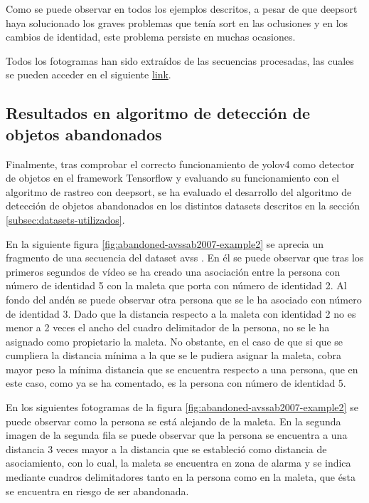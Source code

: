 Como se puede observar en todos los ejemplos descritos, a pesar de que \gls{deepsort} haya solucionado los graves problemas que tenía \gls{sort} en las oclusiones y en los cambios de identidad, este problema persiste en muchas ocasiones.

Todos los fotogramas han sido extraídos de las secuencias procesadas, las cuales se pueden acceder en el siguiente \href{https://drive.google.com/drive/folders/1MIfUcVmwIot6QgV0VRRu5PdFscV1Ma48?usp=sharing}{link}.

\subsection{Resultados en algoritmo de detección de objetos abandonados}
\label{subsec:resultados-abandon-algorithm}

Finalmente, tras comprobar el correcto funcionamiento de \gls{yolov4} como detector de objetos en el framework Tensorflow y evaluando su funcionamiento con el algoritmo de rastreo con \gls{deepsort}, se ha evaluado el desarrollo del algoritmo de detección de objetos abandonados en los distintos datasets descritos en la sección \ref{subsec:datasets-utilizados}.

En la siguiente figura \ref{fig:abandoned-avssab2007-example2} se aprecia un fragmento de una secuencia del dataset \gls{avss} \cite{AVSSAB2007-dataset}. En él se puede observar que tras los primeros segundos de vídeo se ha creado una asociación entre la persona con número de identidad 5 con la maleta que porta con número de identidad 2. Al fondo del andén se puede observar otra persona que se le ha asociado con número de identidad 3. Dado que la distancia respecto a la maleta con identidad 2 no es menor a 2 veces el ancho del cuadro delimitador de la persona, no se le ha asignado como propietario la maleta. No obstante, en el caso de que si que se cumpliera la distancia mínima a la que se le pudiera asignar la maleta, cobra mayor peso la mínima distancia que se encuentra respecto a una persona, que en este caso, como ya se ha comentado, es la persona con número de identidad 5.

En los siguientes fotogramas de la figura \ref{fig:abandoned-avssab2007-example2} se puede observar como la persona se está alejando de la maleta. En la segunda imagen de la segunda fila se puede observar que la persona se encuentra a una distancia 3 veces mayor a la distancia que se estableció como distancia de asociamiento, con lo cual, la maleta se encuentra en zona de alarma y se indica mediante cuadros delimitadores tanto en la persona como en la maleta, que ésta se encuentra en riesgo de ser abandonada.

